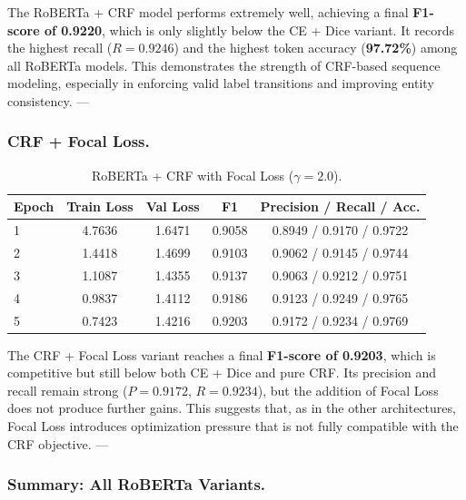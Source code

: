 The RoBERTa + CRF model performs extremely well, achieving a final \textbf{F1-score of 0.9220}, which is only slightly below the CE + Dice variant.
It records the highest recall ($R = 0.9246$) and the highest token accuracy (\textbf{97.72\%}) among all RoBERTa models.
This demonstrates the strength of CRF-based sequence modeling, especially in enforcing valid label transitions and improving entity consistency.
---

\subsubsection{CRF + Focal Loss.}

\begin{table}[H]
\centering
\caption{RoBERTa + CRF with Focal Loss ($\gamma = 2.0$).}
\begin{tabular}{lcccc}
\hline
\textbf{Epoch} & \textbf{Train Loss} & \textbf{Val Loss} & \textbf{F1} & \textbf{Precision} / \textbf{Recall} / \textbf{Acc.} \\
\hline
1 & 4.7636 & 1.6471 & 0.9058 & 0.8949 / 0.9170 / 0.9722 \\
2 & 1.4418 & 1.4699 & 0.9103 & 0.9062 / 0.9145 / 0.9744 \\
3 & 1.1087 & 1.4355 & 0.9137 & 0.9063 / 0.9212 / 0.9751 \\
4 & 0.9837 & 1.4112 & 0.9186 & 0.9123 / 0.9249 / 0.9765 \\
5 & 0.7423 & 1.4216 & 0.9203 & 0.9172 / 0.9234 / 0.9769 \\
\hline
\end{tabular}
\label{tab:roberta_crf_focal}
\end{table}

The CRF + Focal Loss variant reaches a final \textbf{F1-score of 0.9203}, which is competitive but still below both CE + Dice and pure CRF.
Its precision and recall remain strong ($P = 0.9172$, $R = 0.9234$), but the addition of Focal Loss does not produce further gains.
This suggests that, as in the other architectures, Focal Loss introduces optimization pressure that is not fully compatible with the CRF objective.
---

\subsubsection{Summary: All RoBERTa Variants.}

